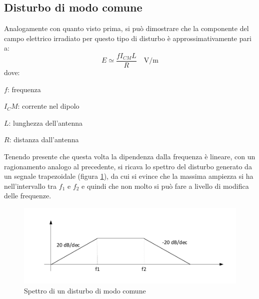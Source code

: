 \documentclass[11pt,4paper]{report}
\begin{document}
\subsection{Disturbo di modo comune}
Analogamente con quanto visto prima, si può dimostrare che la componente del campo elettrico irradiato per questo tipo di disturbo è approssimativamente pari a:
\begin{equation}
	E \simeq \frac{fI_{CM}L}{R} \quad \si{\volt\per\meter}
\end{equation}
dove:
\begin{description}
	\item $f$: frequenza
	\item $I_CM$: corrente nel dipolo
	\item $L$: lunghezza dell'antenna
	\item $R$: distanza dall'antenna
\end{description}

Tenendo presente che questa volta la dipendenza dalla frequenza è lineare, con un ragionamento analogo al precedente, si ricava lo spettro del disturbo generato da un segnale trapezoidale (figura \ref{fig:comm_spettro}), da cui si evince che la massima ampiezza si ha nell'intervallo tra $f_1$ e $f_2$ e quindi che non molto si può fare a livello di modifica delle frequenze.
\begin{figure}[hbtp]
	\centering
	\includegraphics[width=0.7\linewidth]{emc/comm_spettro}
	\caption{Spettro di un disturbo di modo comune}
	\label{fig:comm_spettro}
\end{figure}
\end{document}
